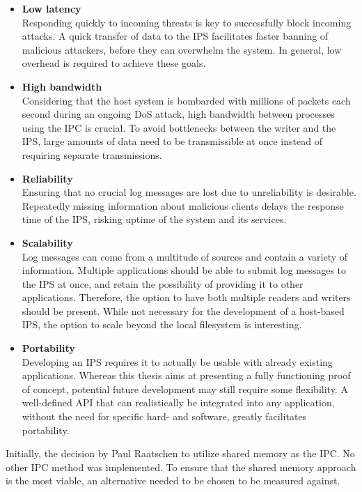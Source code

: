 \begin{itemize}
    \item \textbf{Low latency} \\
        Responding quickly to incoming threats is key to successfully block incoming attacks.
        A quick transfer of data to the \ac{IPS} facilitates faster banning of malicious attackers, before they can overwhelm the system.
        In general, low overhead is required to achieve these goals.
    \item \textbf{High bandwidth} \\
        Considering that the host system is bombarded with millions of packets each second during an ongoing \ac{DoS} attack, high bandwidth between processes using the \ac{IPC} is crucial.
        To avoid bottlenecks between the writer and the \ac{IPS}, large amounts of data need to be transmissible at once instead of requiring separate transmissions.
    \item \textbf{Reliability} \\
        Ensuring that no crucial log messages are lost due to unreliability is desirable.
        Repeatedly missing information about malicious clients delays the response time of the \ac{IPS}, risking uptime of the system and its services.
    \item \textbf{Scalability} \\
        Log messages can come from a multitude of sources and contain a variety of information.
        Multiple applications should be able to submit log messages to the \ac{IPS} at once, and retain the possibility of providing it to other applications.
        Therefore, the option to have both multiple readers and writers should be present.
        While not necessary for the development of a host-based \ac{IPS}, the option to scale beyond the local filesystem is interesting.
    \item \textbf{Portability} \\
        Developing an \ac{IPS} requires it to actually be usable with already existing applications.
        Whereas this thesis aims at presenting a fully functioning proof of concept, potential future development may still require some flexibility.
        A well-defined \ac{API} that can realistically be integrated into any application, without the need for specific hard- and software, greatly facilitates portability.
\end{itemize}

Initially, the decision by Paul Raatschen to utilize shared memory as the \ac{IPC}\cite{raatschen:ipc}.
No other \ac{IPC} method was implemented.
To ensure that the shared memory approach is the most viable, an alternative needed to be chosen to be measured against.

